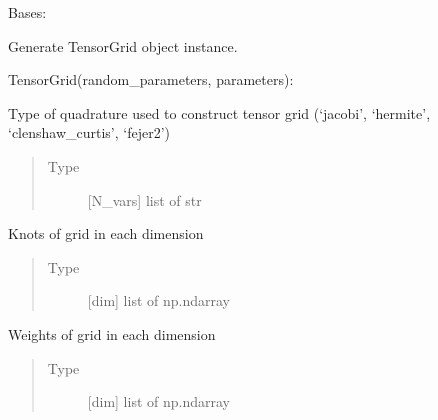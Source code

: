 \documentclass[letterpaper,10pt,english,openany,oneside]{sphinxmanual}
\begin{document}
\begin{fulllineitems}
\label{\detokenize{pygpc:pygpc.Grid.TensorGrid}}
Bases: {\hyperref[\detokenize{pygpc:pygpc.Grid.Grid}]{}}

Generate TensorGrid object instance.

TensorGrid(random\_parameters, parameters):

\begin{fulllineitems}
\label{\detokenize{pygpc:pygpc.Grid.TensorGrid.grid_type}}
Type of quadrature used to construct tensor grid (‘jacobi’, ‘hermite’, ‘clenshaw\_curtis’, ‘fejer2’)
\begin{quote}\begin{description}
\item[{Type}] \leavevmode
{[}N\_vars{]} list of str

\end{description}\end{quote}

\end{fulllineitems}


\begin{fulllineitems}
\label{\detokenize{pygpc:pygpc.Grid.TensorGrid.knots_dim_list}}
Knots of grid in each dimension
\begin{quote}\begin{description}
\item[{Type}] \leavevmode
{[}dim{]} list of np.ndarray

\end{description}\end{quote}

\end{fulllineitems}


\begin{fulllineitems}
\label{\detokenize{pygpc:pygpc.Grid.TensorGrid.weights_dim_list}}
Weights of grid in each dimension
\begin{quote}\begin{description}
\item[{Type}] \leavevmode
{[}dim{]} list of np.ndarray

\end{description}\end{quote}

\end{fulllineitems}


\end{fulllineitems}
\end{document}
